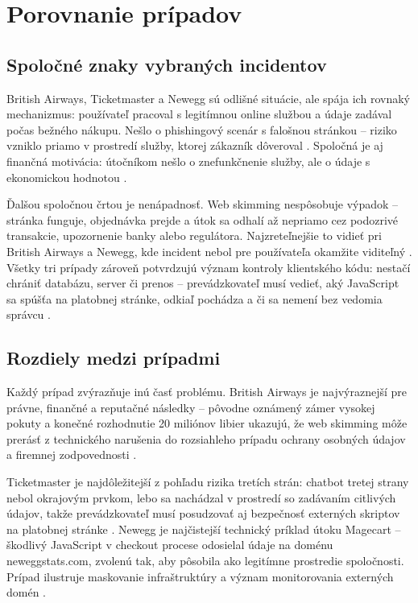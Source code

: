 \section{Porovnanie prípadov}

\subsection{Spoločné znaky vybraných incidentov}

British Airways, Ticketmaster a Newegg sú odlišné situácie, ale spája ich rovnaký mechanizmus: používateľ pracoval s legitímnou online službou a údaje zadával počas bežného nákupu. Nešlo o phishingový scenár s falošnou stránkou -- riziko vzniklo priamo v prostredí služby, ktorej zákazník dôveroval \cite{edpb2019BritishAirways,ico2020Ticketmaster,volexity2018Newegg}. Spoločná je aj finančná motivácia: útočníkom nešlo o znefunkčnenie služby, ale o údaje s ekonomickou hodnotou \cite{fortinet2019MagecartSkimmer}.

Ďalšou spoločnou črtou je nenápadnosť. Web skimming nespôsobuje výpadok -- stránka funguje, objednávka prejde a útok sa odhalí až nepriamo cez podozrivé transakcie, upozornenie banky alebo regulátora. Najzreteľnejšie to vidieť pri British Airways a Newegg, kde incident nebol pre používateľa okamžite viditeľný \cite{simmons2020BritishAirwaysPenalty,volexity2018Newegg,pciSsc2025PaymentPage}. Všetky tri prípady zároveň potvrdzujú význam kontroly klientského kódu: nestačí chrániť databázu, server či prenos -- prevádzkovateľ musí vedieť, aký JavaScript sa spúšťa na platobnej stránke, odkiaľ pochádza a či sa nemení bez vedomia správcu \cite{owaspThirdPartyJavascript,ico2020Ticketmaster,pciSsc2025PaymentPage}.

\subsection{Rozdiely medzi prípadmi}

Každý prípad zvýrazňuje inú časť problému. British Airways je najvýraznejší pre právne, finančné a reputačné následky -- pôvodne oznámený zámer vysokej pokuty a konečné rozhodnutie 20 miliónov libier ukazujú, že web skimming môže prerásť z technického narušenia do rozsiahleho prípadu ochrany osobných údajov a firemnej zodpovednosti \cite{edpb2019BritishAirways,gdprRegister2020BritishAirways}.

Ticketmaster je najdôležitejší z pohľadu rizika tretích strán: chatbot tretej strany nebol okrajovým prvkom, lebo sa nachádzal v prostredí so zadávaním citlivých údajov, takže prevádzkovateľ musí posudzovať aj bezpečnosť externých skriptov na platobnej stránke \cite{ico2020Ticketmaster,pciSsc2025PaymentPage}. Newegg je najčistejší technický príklad útoku Magecart -- škodlivý JavaScript v checkout procese odosielal údaje na doménu neweggstats.com, zvolenú tak, aby pôsobila ako legitímne prostredie spoločnosti. Prípad ilustruje maskovanie infraštruktúry a význam monitorovania externých domén \cite{volexity2018Newegg}.

